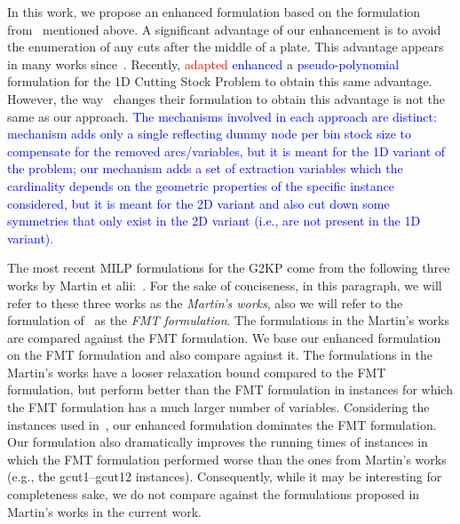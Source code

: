 \documentclass[ppgc,tese,english,formais,babel]{iiufrgs}
\newif\iffinalversion
\newcommand{\newtext}[1]{\iffinalversion%
#1%
\else%
\textcolor{blue}{#1}%
\fi%
}
\newcommand{\oldtext}[1]{\iffinalversion%
\else%
\textcolor{red}{#1}%
\fi%
}
\begin{document}
In this work, we propose an enhanced formulation based on the formulation from~\citet{furini:2016} mentioned above.
A significant advantage of our enhancement is to avoid the enumeration of any cuts after the middle of a plate.
This advantage appears in many works since~\citet{herz:1972}.
Recently, \citet{delorme:2019} \oldtext{adapted}\newtext{enhanced} a \newtext{pseudo-polynomial} formulation for the 1D Cutting Stock Problem to obtain this same advantage.
However, the way \citet{delorme:2019}~changes their formulation to obtain this advantage is not the same as our approach.
\newtext{The mechanisms involved in each approach are distinct: \citet{delorme:2019} mechanism adds only a single reflecting dummy node per bin stock size to compensate for the removed arcs/variables, but it is meant for the 1D variant of the problem; our mechanism adds a set of extraction variables which the cardinality depends on the geometric properties of the specific instance considered, but it is meant for the 2D variant and also cut down some symmetries that only exist in the 2D variant (i.e., are not present in the 1D variant).}

The most recent MILP formulations for the G2KP come from the following three works by Martin et alii:~\citet{martin:2020:models,martin:2020:bottom,martin:2020:top}.
For the sake of conciseness, in this paragraph, we will refer to these three works as the \emph{Martin's works}, also we will refer to the formulation of~\citet{furini:2016} as the \emph{FMT formulation}.
The formulations in the Martin's works are compared against the FMT formulation.
We base our enhanced formulation on the FMT formulation and also compare against it.
The formulations in the Martin's works have a looser relaxation bound compared to the FMT formulation, but perform better than the FMT formulation in instances for which the FMT formulation has a much larger number of variables.
Considering the instances used in~\citet{furini:2016}, our enhanced formulation dominates the FMT formulation.
Our formulation also dramatically improves the running times of instances in which the FMT formulation performed worse than the ones from Martin's works (e.g., the gcut1--gcut12 instances).
Consequently, while it may be interesting for completeness sake, we do not compare against the formulations proposed in Martin's works in the current work.
\end{document}
